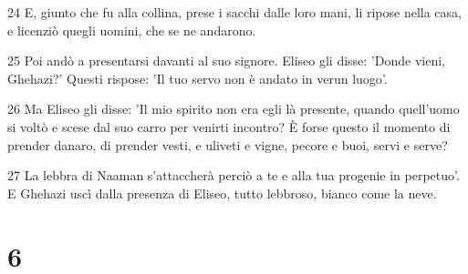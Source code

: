 \par 24 E, giunto che fu alla collina, prese i sacchi dalle loro mani, li ripose nella casa, e licenziò quegli uomini, che se ne andarono.
\par 25 Poi andò a presentarsi davanti al suo signore. Eliseo gli disse: 'Donde vieni, Ghehazi?' Questi rispose: 'Il tuo servo non è andato in verun luogo'.
\par 26 Ma Eliseo gli disse: 'Il mio spirito non era egli là presente, quando quell'uomo si voltò e scese dal suo carro per venirti incontro? È forse questo il momento di prender danaro, di prender vesti, e uliveti e vigne, pecore e buoi, servi e serve?
\par 27 La lebbra di Naaman s'attaccherà perciò a te e alla tua progenie in perpetuo'. E Ghehazi uscì dalla presenza di Eliseo, tutto lebbroso, bianco come la neve.

\chapter{6}

